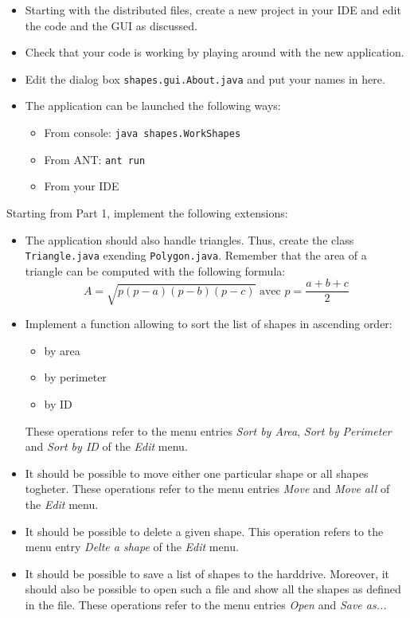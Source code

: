\begin{itemize}
\item Starting with the distributed files, create a new project in your IDE and edit the code and the GUI as discussed.
\item Check that your code is working by playing around with the new application.
\item Edit the dialog box \texttt{shapes.gui.About.java} and put your names in here.
\item The application can be launched the following ways:
\begin{itemize}
 \item From console: \texttt{java shapes.WorkShapes}
 \item From ANT: \texttt{ant run}
 \item From your IDE
\end{itemize}


\end{itemize}


Starting from Part 1, implement the following extensions:
\begin{itemize}
 \item The application should also handle triangles. Thus, create the class \texttt{Triangle.java} exending \texttt{Polygon.java}. Remember that the area of a triangle can be computed with the following formula: $$A=\sqrt{p(p-a)(p-b)(p-c)} \text{ avec } p=\frac{a+b+c}{2}$$
 \item Implement a function allowing to sort the list of shapes in ascending order:
 \begin{itemize}
  \item by area
  \item by perimeter
  \item by ID
 \end{itemize}
 These operations refer to the menu entries \emph{Sort by Area}, \emph{Sort by Perimeter} and \emph{Sort by ID} of the \emph{Edit} menu.
\item It should be possible to move either one particular shape or all shapes togheter. These operations refer to the menu entries \emph{Move} and \emph{Move all} of the \emph{Edit} menu.
\item It should be possible to delete a given shape. This operation refers to the menu entry \emph{Delte a shape} of the \emph{Edit} menu.
\item It should be possible to save a list of shapes to the harddrive. Moreover, it should also be possible to open such a file and show all the shapes as defined in the file. These operations refer to the menu entries \emph{Open} and \emph{Save as...}
\end{itemize}

